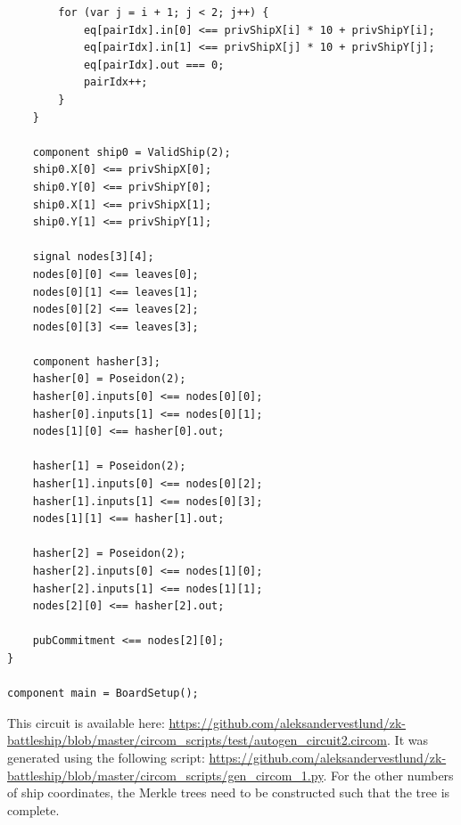 \begin{listing}[H]
    \ContinuedFloat
    \begin{verbatim}
        for (var j = i + 1; j < 2; j++) {
            eq[pairIdx].in[0] <== privShipX[i] * 10 + privShipY[i];
            eq[pairIdx].in[1] <== privShipX[j] * 10 + privShipY[j];
            eq[pairIdx].out === 0;
            pairIdx++;
        }
    }
        
    component ship0 = ValidShip(2);
    ship0.X[0] <== privShipX[0];
    ship0.Y[0] <== privShipY[0];
    ship0.X[1] <== privShipX[1];
    ship0.Y[1] <== privShipY[1];

    signal nodes[3][4];
    nodes[0][0] <== leaves[0];
    nodes[0][1] <== leaves[1];
    nodes[0][2] <== leaves[2];
    nodes[0][3] <== leaves[3];

    component hasher[3];
    hasher[0] = Poseidon(2);
    hasher[0].inputs[0] <== nodes[0][0];
    hasher[0].inputs[1] <== nodes[0][1];
    nodes[1][0] <== hasher[0].out;

    hasher[1] = Poseidon(2);
    hasher[1].inputs[0] <== nodes[0][2];
    hasher[1].inputs[1] <== nodes[0][3];
    nodes[1][1] <== hasher[1].out;

    hasher[2] = Poseidon(2);
    hasher[2].inputs[0] <== nodes[1][0];
    hasher[2].inputs[1] <== nodes[1][1];
    nodes[2][0] <== hasher[2].out;

    pubCommitment <== nodes[2][0];
}

component main = BoardSetup();
    \end{verbatim}
    \caption{Merkle tree commitment for two coordinates (continued).}
    \label{lst:initialProofCircuitMerkleD}
\end{listing}

This circuit is available here: \url{https://github.com/aleksandervestlund/zk-battleship/blob/master/circom_scripts/test/autogen_circuit2.circom}. It was generated using the following script: \url{https://github.com/aleksandervestlund/zk-battleship/blob/master/circom_scripts/gen_circom_1.py}. For the other numbers of ship coordinates, the Merkle trees need to be constructed such that the tree is complete.

